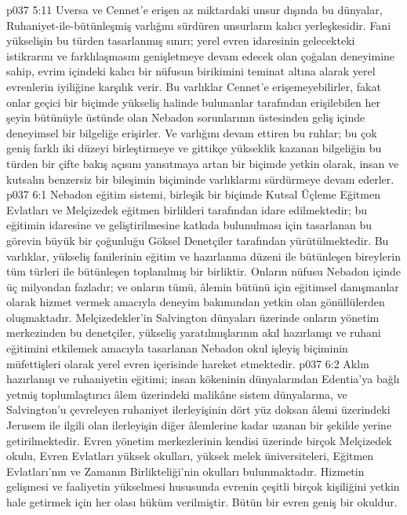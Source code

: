 \vs p037 5:11 Uversa ve Cennet’e erişen az miktardaki unsur dışında bu dünyalar, Ruhaniyet\hyp{}ile\hyp{}bütünleşmiş varlığını sürdüren unsurların kalıcı yerleşkesidir. Fani yükselişin bu türden tasarlanmış sınırı; yerel evren idaresinin gelecekteki istikrarını ve farklılaşmasını genişletmeye devam edecek olan çoğalan deneyimine sahip, evrim içindeki kalıcı bir nüfusun birikimini teminat altına alarak yerel evrenlerin iyiliğine karşılık verir. Bu varlıklar Cennet’e erişemeyebilirler, fakat onlar geçici bir biçimde yükseliş halinde bulunanlar tarafından erişilebilen her şeyin bütünüyle üstünde olan Nebadon sorunlarının üstesinden geliş içinde deneyimsel bir bilgeliğe erişirler. Ve varlığını devam ettiren bu ruhlar; bu çok geniş farklı iki düzeyi birleştirmeye ve gittikçe yükseklik kazanan bilgeliğin bu türden bir çifte bakış açısını yansıtmaya artan bir biçimde yetkin olarak, insan ve kutsalın benzersiz bir bileşimin biçiminde varlıklarını sürdürmeye devam ederler.
\vs p037 6:1 Nebadon eğitim sistemi, birleşik bir biçimde Kutsal Üçleme Eğitmen Evlatları ve Melçizedek eğitmen birlikleri tarafından idare edilmektedir; bu eğitimin idaresine ve geliştirilmesine katkıda bulunulması için tasarlanan bu görevin büyük bir çoğunluğu Göksel Denetçiler tarafından yürütülmektedir. Bu varlıklar, yükseliş fanilerinin eğitim ve hazırlanma düzeni ile bütünleşen bireylerin tüm türleri ile bütünleşen toplanılmış bir birliktir. Onların nüfusu Nebadon içinde üç milyondan fazladır; ve onların tümü, âlemin bütünü için eğitimsel danışmanlar olarak hizmet vermek amacıyla deneyim bakımından yetkin olan gönüllülerden oluşmaktadır. Melçizedekler’in Salvington dünyaları üzerinde onların yönetim merkezinden bu denetçiler, yükseliş yaratılmışlarının akıl hazırlanışı ve ruhani eğitimini etkilemek amacıyla tasarlanan Nebadon okul işleyiş biçiminin müfettişleri olarak yerel evren içerisinde hareket etmektedir.
\vs p037 6:2 Aklın hazırlanışı ve ruhaniyetin eğitimi; insan kökeninin dünyalarından Edentia’ya bağlı yetmiş toplumlaştırıcı âlem üzerindeki malikâne sistem dünyalarına, ve Salvington’u çevreleyen ruhaniyet ilerleyişinin dört yüz doksan âlemi üzerindeki Jerusem ile ilgili olan ilerleyişin diğer âlemlerine kadar uzanan bir şekilde yerine getirilmektedir. Evren yönetim merkezlerinin kendisi üzerinde birçok Melçizedek okulu, Evren Evlatları yüksek okulları, yüksek melek üniversiteleri, Eğitmen Evlatları’nın ve Zamanın Birlikteliği’nin okulları bulunmaktadır. Hizmetin gelişmesi ve faaliyetin yükselmesi hususunda evrenin çeşitli birçok kişiliğini yetkin hale getirmek için her olası hüküm verilmiştir. Bütün bir evren geniş bir okuldur.
